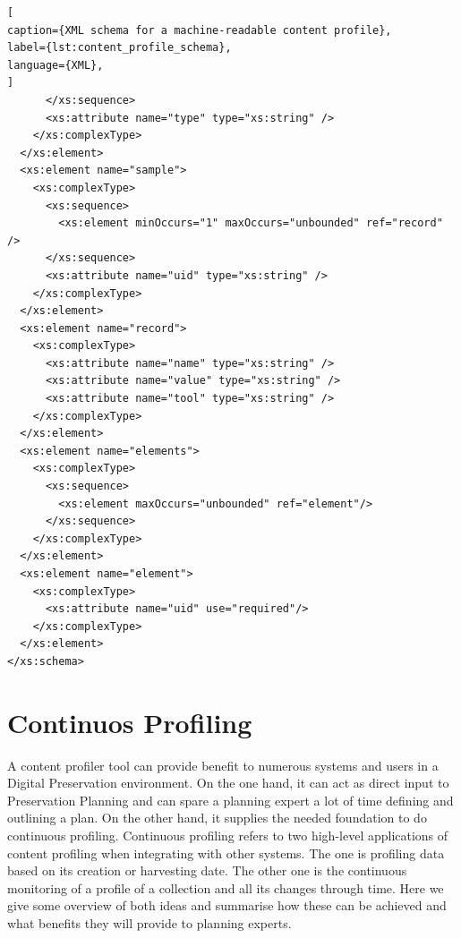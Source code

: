 \begin{lstlisting}[
caption={XML schema for a machine-readable content profile},
label={lst:content_profile_schema},
language={XML},
]
      </xs:sequence>
      <xs:attribute name="type" type="xs:string" />
    </xs:complexType>
  </xs:element>
  <xs:element name="sample">
    <xs:complexType>
      <xs:sequence>
        <xs:element minOccurs="1" maxOccurs="unbounded" ref="record" />
      </xs:sequence>
      <xs:attribute name="uid" type="xs:string" />
    </xs:complexType>
  </xs:element>
  <xs:element name="record">
    <xs:complexType>
      <xs:attribute name="name" type="xs:string" />
      <xs:attribute name="value" type="xs:string" />
      <xs:attribute name="tool" type="xs:string" />
    </xs:complexType>
  </xs:element>
  <xs:element name="elements">
    <xs:complexType>
      <xs:sequence>
        <xs:element maxOccurs="unbounded" ref="element"/>
      </xs:sequence>
    </xs:complexType>
  </xs:element>
  <xs:element name="element">
    <xs:complexType>
      <xs:attribute name="uid" use="required"/>
    </xs:complexType>
  </xs:element>
</xs:schema>
\end{lstlisting}

\clearpage


\section{Continuos Profiling}
A content profiler tool can provide benefit to numerous systems and users in a Digital Preservation environment. On the one hand, it can act as direct input to Preservation Planning and can spare a planning expert a lot of time defining and outlining a plan. On the other hand, it supplies the needed foundation to do continuous profiling. Continuous profiling refers to two high-level applications of content profiling when integrating with other systems. The one is profiling data based on its creation or harvesting date. The other one is the continuous monitoring of a profile of a collection and all its changes through time. Here we give some overview of both ideas and summarise how these can be achieved and what benefits they will provide to planning experts.

